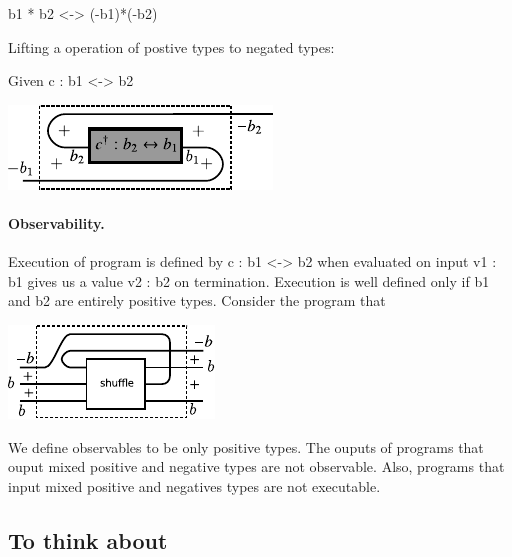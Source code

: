 \documentclass[preprint]{sigplanconf}
\begin{document}
{{b1 * b2 <-> (-b1)*(-b2)}}


Lifting a operation of postive types to negated types:

Given {{c : b1 <-> b2}}

\begin{center}
  \includegraphics{diagrams/neg_lift.pdf}
\end{center}




\paragraph*{Observability.} 
Execution of program is defined by {{c : b1 <-> b2}} when evaluated on
input {{v1 : b1}} gives us a value {{v2 : b2}} on
termination. Execution is well defined only if {{b1}} and {{b2}} are
entirely positive types. Consider the program that

\begin{center}
  \includegraphics{diagrams/shuffle.pdf}
\end{center}

We define observables to be only positive types. The ouputs of
programs that ouput mixed positive and negative types are not
observable.  Also, programs that input mixed positive and negatives
types are not executable.

\subsection{To think about}
\end{document}
